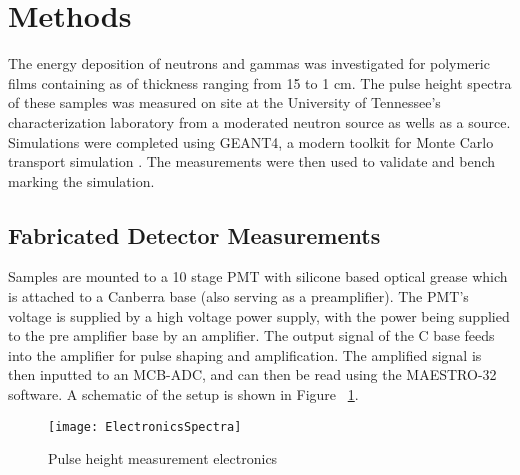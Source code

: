 \documentclass[draftcls,onecolumn]{IEEEtran}
\begin{document}
\section{Methods}
\label{sec:Methods}
The energy deposition of neutrons and gammas was investigated for polymeric films containing  as  of thickness ranging from 15 \micron to 1 cm.
The pulse height spectra of these samples was measured on site at the University of Tennessee's characterization laboratory from a moderated neutron source as wells as a  source.
Simulations were completed using GEANT4, a modern toolkit for Monte Carlo transport simulation \cite{agostinelli_geant4simulation_2003,allison_geant4_2006}.
The measurements were then used to validate and bench marking the simulation.

\subsection{Fabricated Detector Measurements}
Samples are mounted to a 10 stage PMT with silicone based optical grease which is attached to a Canberra base (also serving as a preamplifier). 
The PMT's voltage is supplied by a high voltage power supply, with the power being supplied to the pre amplifier base by an amplifier.  
The output signal of the C base feeds into the amplifier for pulse shaping and amplification. 
The amplified signal is then inputted to an MCB-ADC, and can then be read using the MAESTRO-32 software. 
A schematic of the setup is shown in Figure ~\ref{fig:ElectronicsSpectra}.
\begin{figure}
	\centering
	\texttt{[image: ElectronicsSpectra]}
	\caption{Pulse height measurement electronics}
	\label{fig:ElectronicsSpectra}
\end{figure}
\end{document}
